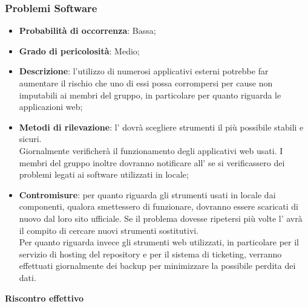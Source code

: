 		\subsubsection{Problemi Software} %
		\label{ssub:problemi_software}
			\begin{itemize}
				\item \textbf{Probabilità di occorrenza}: Bassa;
				\item \textbf{Grado di pericolosità}: Medio;
				\item \textbf{Descrizione}: l'utilizzo di numerosi applicativi esterni potrebbe far aumentare il rischio che uno di essi possa corrompersi per cause non imputabili ai membri del gruppo, in particolare per quanto riguarda le applicazioni web;
				\item \textbf{Metodi di rilevazione}: l'\roleAdministrator{} dovrà scegliere strumenti il più possibile stabili e sicuri. \\
				Giornalmente verificherà il funzionamento degli applicativi web usati. I membri del gruppo inoltre dovranno notificare all'\roleAdministrator{} se si verificassero dei problemi legati ai software utilizzati in locale;
				\item \textbf{Contromisure}: per quanto riguarda gli strumenti usati in locale dai componenti, qualora smettessero di funzionare, dovranno essere scaricati di nuovo dal loro sito ufficiale. Se il problema dovesse ripetersi più volte l'\roleAdministrator{} avrà il compito di cercare nuovi strumenti sostitutivi. \\
				Per quanto riguarda invece gli strumenti web utilizzati, in particolare per il servizio di hosting del repository e per il sistema di ticketing, verranno effettuati giornalmente dei backup per minimizzare la possibile perdita dei dati.
			\end{itemize}
		\noindent
		\textbf{Riscontro effettivo}
